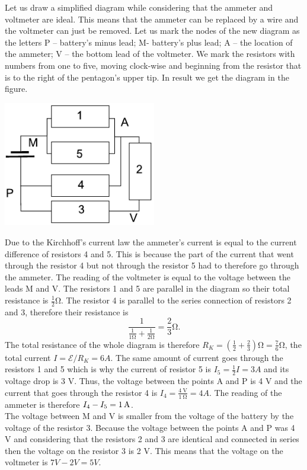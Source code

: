 \documentclass[11pt]{article}
\begin{document}
\solueng
Let us draw a simplified diagram while considering that the ammeter and voltmeter are ideal. This means that the ammeter can be replaced by a wire and the voltmeter can just be removed. Let us mark the nodes of the new diagram as the letters P – battery’s minus lead; M- battery’s plus lead; A – the location of the ammeter; V – the bottom lead of the voltmeter. We mark the resistors with numbers from one to five, moving clock-wise and beginning from the resistor that is to the right of the pentagon’s upper tip. In result we get the diagram in the figure.
\begin{center}
	\includegraphics[width=0.5\textwidth]{2017-v3g-06-viisnurk-lah}
\end{center}
Due to the Kirchhoff’s current law the ammeter’s current is equal to the current difference of resistors 4 and 5. This is because the part of the current that went through the resistor 4 but not through the resistor 5 had to therefore go through the ammeter. The reading of the voltmeter is equal to the voltage between the leads M and V. The resistors 1 and 5 are parallel in the diagram so their total resistance is $\frac{1}{2}\si{\ohm}$. The resistor 4 is parallel to the series connection of resistors 2 and 3, therefore their resistance is
$$\frac{1}{\frac{1}{1\si{\ohm}}+\frac{1}{2\si{\ohm}}} = \frac 23 \si{\ohm}. $$ 
The total resistance of the whole diagram is therefore $R_K=\left(\frac 12 + 
\frac 23\right)\si{\ohm}=\frac 76\si{\ohm}$, the total current $I=\mathcal 
E/R_K=\SI{6}A$. The same amount of current goes through the resistors 1 and 5 which is why the current of resistor 5 is $I_5=\frac 12 I=\SI{3}A$ and its voltage drop is 3 V. Thus, the voltage between the points A and P is 4 V and the current that goes through the resistor 4 is $I_4=\frac{\SI{4}{\volt}}{\SI{1}{\ohm}}=\SI{4}A$. The reading of the ammeter is therefore $I_4-I_5=\SI 1A$.\\
The voltage between M and V is smaller from the voltage of the battery by the voltage of the resistor 3. Because the voltage between the points A and P was 4 V and considering that the resistors 2 and 3 are identical and connected in series then the voltage on the resistor 3 is 2 V. This means that the voltage on the voltmeter is $\SI{7}V -\SI{2}V= \SI{5}V$.
\probend
\bigskip
\end{document}
